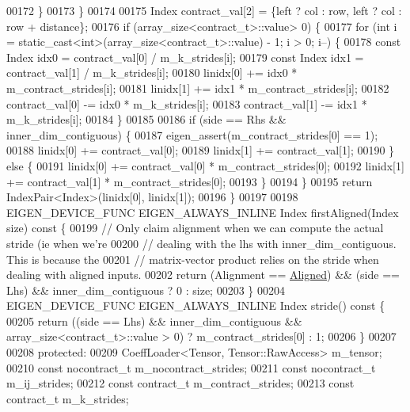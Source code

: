 \begin{DoxyCode}
00172       \}
00173     \}
00174 
00175     Index contract\_val[2] = \{left ? col : row, left ? col : row + distance\};
00176     \textcolor{keywordflow}{if} (array\_size<contract\_t>::value> 0) \{
00177       \textcolor{keywordflow}{for} (\textcolor{keywordtype}{int} i = static\_cast<int>(array\_size<contract\_t>::value) - 1; i > 0; i--) \{
00178         \textcolor{keyword}{const} Index idx0 = contract\_val[0] / m\_k\_strides[i];
00179         \textcolor{keyword}{const} Index idx1 = contract\_val[1] / m\_k\_strides[i];
00180         linidx[0] += idx0 * m\_contract\_strides[i];
00181         linidx[1] += idx1 * m\_contract\_strides[i];
00182         contract\_val[0] -= idx0 * m\_k\_strides[i];
00183         contract\_val[1] -= idx1 * m\_k\_strides[i];
00184       \}
00185 
00186       \textcolor{keywordflow}{if} (side == Rhs && inner\_dim\_contiguous) \{
00187         eigen\_assert(m\_contract\_strides[0] == 1);
00188         linidx[0] += contract\_val[0];
00189         linidx[1] += contract\_val[1];
00190       \} \textcolor{keywordflow}{else} \{
00191         linidx[0] += contract\_val[0] * m\_contract\_strides[0];
00192         linidx[1] += contract\_val[1] * m\_contract\_strides[0];
00193       \}
00194     \}
00195     \textcolor{keywordflow}{return} IndexPair<Index>(linidx[0], linidx[1]);
00196   \}
00197 
00198   EIGEN\_DEVICE\_FUNC EIGEN\_ALWAYS\_INLINE Index firstAligned(Index size)\textcolor{keyword}{ const }\{
00199     \textcolor{comment}{// Only claim alignment when we can compute the actual stride (ie when we're}
00200     \textcolor{comment}{// dealing with the lhs with inner\_dim\_contiguous. This is because the}
00201     \textcolor{comment}{// matrix-vector product relies on the stride when dealing with aligned inputs.}
00202     \textcolor{keywordflow}{return} (Alignment == \hyperlink{group__enums_gga45fe06e29902b7a2773de05ba27b47a1ad37d4c71425bb286e9b4103830538fbf}{Aligned}) && (side == Lhs) && inner\_dim\_contiguous ? 0 : size;
00203   \}
00204   EIGEN\_DEVICE\_FUNC EIGEN\_ALWAYS\_INLINE Index stride()\textcolor{keyword}{ const }\{
00205     \textcolor{keywordflow}{return} ((side == Lhs) && inner\_dim\_contiguous && array\_size<contract\_t>::value > 0) ? 
      m\_contract\_strides[0] : 1;
00206   \}
00207 
00208  \textcolor{keyword}{protected}:
00209   CoeffLoader<Tensor, Tensor::RawAccess> m\_tensor;
00210   \textcolor{keyword}{const} nocontract\_t m\_nocontract\_strides;
00211   \textcolor{keyword}{const} nocontract\_t m\_ij\_strides;
00212   \textcolor{keyword}{const} contract\_t m\_contract\_strides;
00213   \textcolor{keyword}{const} contract\_t m\_k\_strides;

\end{DoxyCode}
